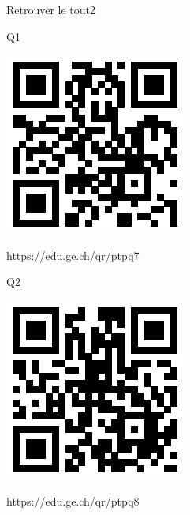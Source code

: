 \documentclass[a4paper,11pt]{report}
\begin{document}
\begin{qmoodle}{Retrouver le tout}{2}{
	\begin{center}	
		Q1

\includegraphics[scale=1]{media/qr/ptpq7}

\tiny{{https://edu.ge.ch/qr/ptpq7}}
\end{center}
	\begin{center}	
		Q2

\includegraphics[scale=1]{media/qr/ptpq8}

\tiny{{https://edu.ge.ch/qr/ptpq8}}
\end{center}
}
\end{qmoodle}


\end{document}
